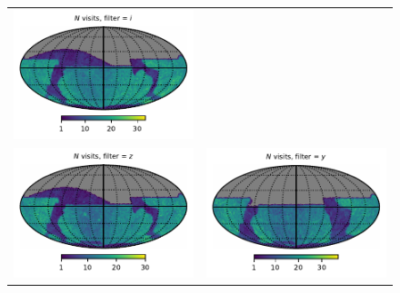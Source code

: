 \documentclass[preprintm,linenumbers]{aastex631}
\begin{document}
\begin{figure}
\begin{tabular}{@{}c@{}c@{}}
			\includegraphics{results/skymaps/skymap_first_year_one_snap_v4_0_10yrs_db_noDD_noTwi_nside-256_CountMetric_i_noDD_noTwi.pdf} \\
			\includegraphics{results/skymaps/skymap_first_year_one_snap_v4_0_10yrs_db_noDD_noTwi_nside-256_CountMetric_z_noDD_noTwi.pdf} &
			\includegraphics{results/skymaps/skymap_first_year_one_snap_v4_0_10yrs_db_noDD_noTwi_nside-256_CountMetric_y_noDD_noTwi.pdf} \\

\end{tabular}
\end{figure}
\end{document}
